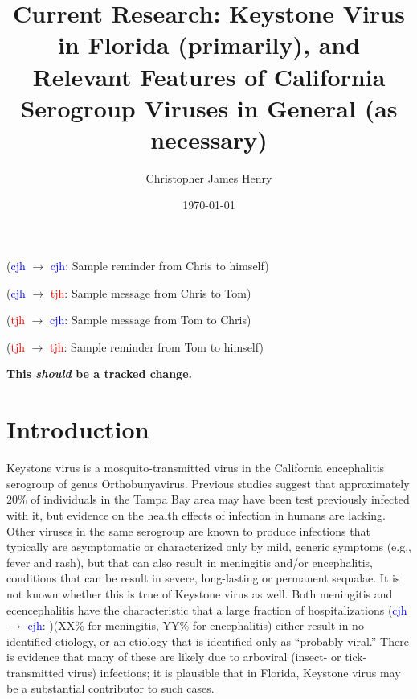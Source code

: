 \documentclass{article}
\title%
{Current Research: Keystone Virus in Florida (primarily), and Relevant Features of California Serogroup Viruses in General (as necessary)}
\author%
{Christopher James Henry}
\date{\today}
\newcommand{\cjh}{\textcolor{blue}{cjh}}
\newcommand{\tjh}{\textcolor{red}{tjh}}
\newcommand{\msg}[3]{(#1 $\rightarrow$ #2: #3)}
\newcommand{\mcc}[1]{\msg\cjh\cjh{#1}}
\newcommand{\mct}[1]{\msg\cjh\tjh{#1}}
\newcommand{\mtc}[1]{\msg\tjh\cjh{#1}}
\newcommand{\mtt}[1]{\msg\tjh\tjh{#1}}
\begin{document}
    \titlepage
    
    \mcc{Sample reminder from Chris to himself} 

    \mct{Sample message from Chris to Tom} 

    \mtc{Sample message from Tom to Chris} 

    \mtt{Sample reminder from Tom to himself} 


    \textbf{This \textit{should} be a tracked change.}

    \section{Introduction}
        Keystone virus is a mosquito-transmitted virus in the California encephalitis serogroup of genus Orthobunyavirus. Previous studies suggest that approximately 20\% of individuals in the Tampa Bay area may have been test previously infected with it, but evidence on the health effects of infection in humans are lacking. Other viruses in the same serogroup are known to produce infections that typically are asymptomatic or characterized only by mild, generic symptoms (e.g., fever and rash), but that can also result in meningitis and/or encephalitis, conditions that can be result in severe, long-lasting or permanent sequalae. It is not known whether this is true of Keystone virus as well. Both meningitis and ecencephalitis have the characteristic that a large fraction of hospitalizations \mcc{}(XX\% for meningitis, YY\% for encephalitis) either result in no identified etiology, or an etiology that is identified only as ``probably viral.'' There is evidence that many of these are likely due to arboviral (insect- or tick-transmitted virus) infections; it is plausible that in Florida, Keystone virus may be a substantial contributor to such cases.
\end{document}
